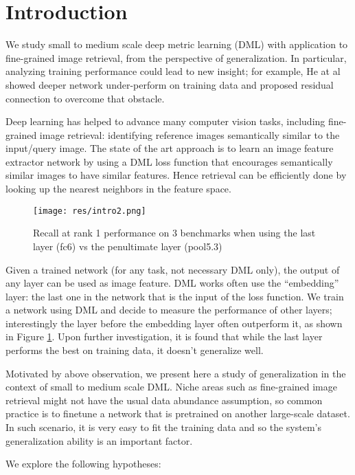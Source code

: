 \documentclass[10pt,twocolumn,letterpaper]{article}
\begin{document}
\section{Introduction}


We study small to medium scale deep metric learning (DML) with application to fine-grained image retrieval, from the perspective of generalization. In particular, analyzing training performance could lead to new insight; for example, He at al \cite{he2016deep} showed deeper network under-perform on training data and proposed residual connection to overcome that obstacle.


Deep learning has helped to advance many computer vision tasks, including fine-grained image retrieval: identifying reference images semantically similar to the input/query image. The state of the art approach is to learn an image feature extractor network by using a DML loss function that encourages semantically similar images to have similar features. Hence retrieval can be efficiently done by looking up the nearest neighbors in the feature space.


\begin{figure}
  \texttt{[image: res/intro2.png]}
  \caption{Recall at rank 1 performance on 3 benchmarks when using the last layer (fc6) vs the penultimate layer (pool5.3)}
  \label{fig:intro}
\end{figure}



Given a trained network (for any task, not necessary DML only), the output of any layer can be used as image feature. DML works often use the ``embedding'' layer: the last one in the network that is the input of the loss function. We train a network using DML and decide to measure the performance of other layers; interestingly the layer before the embedding layer often outperform it, as shown in Figure \ref{fig:intro}. Upon further investigation, it is found that while the last layer performs the best on training data, it doesn't generalize well.

Motivated by above observation, we present here a study of generalization in the context of small to medium scale DML. Niche areas such as fine-grained image retrieval might not have the usual data abundance assumption, so common practice is to finetune a network that is pretrained on another large-scale dataset. In such scenario, it is very easy to fit the training data and so the system's generalization ability is an important factor.

We explore the following hypotheses:
\end{document}
